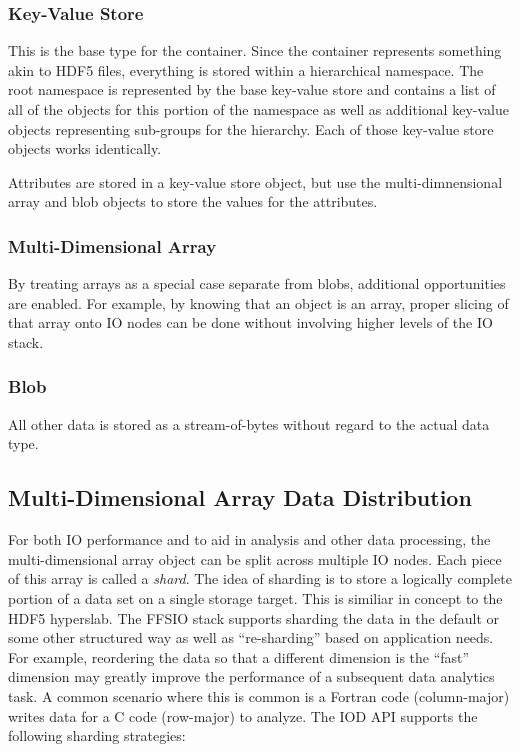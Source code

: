 \documentclass[conference]{IEEEtran}
\begin{document}
\subsubsection{Key-Value Store}
This is the base type for the container. Since the container represents
something akin to HDF5 files, everything is stored within a hierarchical
namespace. The root namespace is represented by the base key-value store and
contains a list of all of the objects for this portion of the namespace as well
as additional key-value objects representing sub-groups for the hierarchy. Each
of those key-value store objects works identically.

Attributes are stored in a key-value store object, but use the
multi-dimnensional array and blob objects to store the values for the
attributes.

\subsubsection{Multi-Dimensional Array}
By treating arrays as a special case separate from blobs, additional
opportunities are enabled. For example, by knowing that an object is an array,
proper slicing of that array onto IO nodes can be done without involving higher
levels of the IO stack.

\subsubsection{Blob}
All other data is stored as a stream-of-bytes without regard to the actual
data type.

\subsection{Multi-Dimensional Array Data Distribution}

For both IO performance and to aid in analysis and other data processing, the
multi-dimensional array object can be split across multiple IO nodes. Each
piece of this array is called a {\em shard}.  The idea of sharding is to store
a logically complete portion of a data set on a single storage target. This is
similiar in concept to the HDF5 hyperslab.  The FFSIO stack supports sharding
the data in the default or some other structured way as well as ``re-sharding''
based on application needs. For example, reordering the data so that a
different dimension is the ``fast'' dimension may greatly improve the
performance of a subsequent data analytics task. A common scenario where this
is common is a Fortran code (column-major) writes data for a C code (row-major)
to analyze.  The IOD API supports the following sharding strategies:
\end{document}
